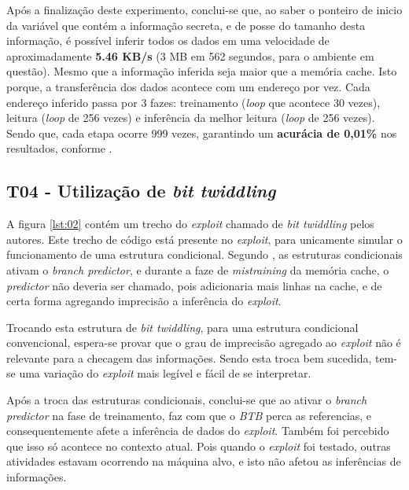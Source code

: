\documentclass[
	article,			    %
	12pt,				    %
	oneside,			    %
	a4paper,			    %
	chapter=TITLE,		    %
	section=TITLE,		    %
	subsection=TITLE,	    %
	english,			    %
	brazil,				    %
	sumario=tradicional
]{abntex2}
\begin{document}
Após a finalização deste experimento, conclui-se que, ao saber o ponteiro de inicio da variável que contém a informação secreta, e de posse do tamanho desta informação, é possível inferir todos os dados em uma velocidade de aproximadamente \textbf{5.46 KB/s} (3 MB em 562 segundos, para o ambiente em questão). Mesmo que a informação inferida seja maior que a memória cache. Isto porque, a transferência dos dados acontece com um endereço por vez. Cada endereço inferido passa por 3 fazes: treinamento (\emph{loop} que acontece 30 vezes), leitura (\emph{loop} de 256 vezes) e inferência da melhor leitura (\emph{loop} de 256 vezes). Sendo que, cada etapa ocorre 999 vezes, garantindo um \textbf{acurácia de 0,01\%} nos resultados, conforme .

\begin{comment}
Adicionar uma imagem com as saídas.
Retirar a parte dos benchmarks, pois pode conter erros grotescos, por causa da lei dos grandes números.
\end{comment}

\subsection{T04 - Utilização de \emph{bit twiddling}}
A figura \ref{lst:02} contém um trecho do \emph{exploit} chamado de \emph{bit twiddling} pelos autores. Este trecho de código está presente no \emph{exploit}, para unicamente simular o funcionamento de uma estrutura condicional. Segundo , as estruturas condicionais ativam o \emph{branch predictor}, e durante a faze de \emph{mistraining} da memória cache, o \emph{predictor} não deveria ser chamado, pois adicionaria mais linhas na cache, e de certa forma agregando imprecisão a inferência do \emph{exploit}.



Trocando esta estrutura de \emph{bit twiddling}, para uma estrutura condicional convencional, espera-se provar que o grau de imprecisão agregado ao \emph{exploit} não é relevante para a checagem das informações. Sendo esta troca bem sucedida, tem-se uma variação do \emph{exploit} mais legível e fácil de se interpretar.

Após a troca das estruturas condicionais, conclui-se que ao ativar o \emph{branch predictor} na fase de treinamento, faz com que o \emph{BTB} perca as referencias, e consequentemente afete a inferência de dados do \emph{exploit}. Também foi percebido que isso só acontece no contexto atual. Pois quando o \emph{exploit} foi testado, outras atividades estavam ocorrendo na máquina alvo, e isto não afetou as inferências de informações.
\end{document}
